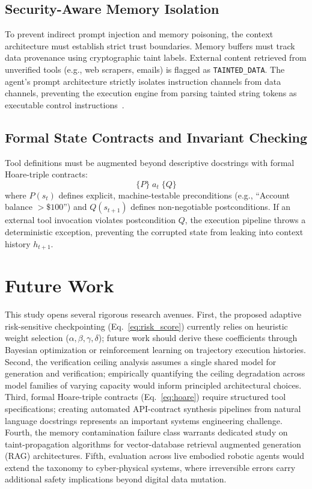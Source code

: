 \documentclass[conference]{IEEEtran}
\begin{document}
\subsection{Security-Aware Memory Isolation}
To prevent indirect prompt injection and memory poisoning, the context architecture must establish strict trust boundaries. Memory buffers must track data provenance using cryptographic taint labels. External content retrieved from unverified tools (e.g., web scrapers, emails) is flagged as \texttt{TAINTED\_DATA}. The agent's prompt architecture strictly isolates instruction channels from data channels, preventing the execution engine from parsing tainted string tokens as executable control instructions~\cite{debenedetti2024agentdojo}.

\subsection{Formal State Contracts and Invariant Checking}
Tool definitions must be augmented beyond descriptive docstrings with formal Hoare-triple contracts:
\begin{equation}
\{P\} \; a_t \; \{Q\}
\label{eq:hoare}
\end{equation}
where $P(s_t)$ defines explicit, machine-testable preconditions (e.g., ``Account balance $> \$100$'') and $Q(s_{t+1})$ defines non-negotiable postconditions. If an external tool invocation violates postcondition $Q$, the execution pipeline throws a deterministic exception, preventing the corrupted state from leaking into context history $h_{t+1}$.

\section{Future Work}
This study opens several rigorous research avenues. First, the proposed adaptive risk-sensitive checkpointing (Eq.~\ref{eq:risk_score}) currently relies on heuristic weight selection ($\alpha, \beta, \gamma, \delta$); future work should derive these coefficients through Bayesian optimization or reinforcement learning on trajectory execution histories. Second, the verification ceiling analysis assumes a single shared model for generation and verification; empirically quantifying the ceiling degradation across model families of varying capacity would inform principled architectural choices. Third, formal Hoare-triple contracts (Eq.~\ref{eq:hoare}) require structured tool specifications; creating automated API-contract synthesis pipelines from natural language docstrings represents an important systems engineering challenge. Fourth, the memory contamination failure class warrants dedicated study on taint-propagation algorithms for vector-database retrieval augmented generation (RAG) architectures. Fifth, evaluation across live embodied robotic agents would extend the taxonomy to cyber-physical systems, where irreversible errors carry additional safety implications beyond digital data mutation.
\end{document}
